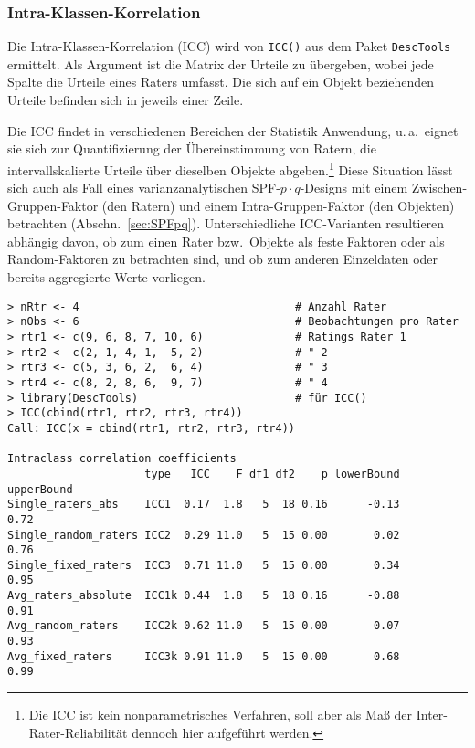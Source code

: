 \subsubsection{Intra-Klassen-Korrelation}

Die Intra-Klassen-Korrelation (ICC) wird von \lstinline!ICC()! aus dem Paket \lstinline!DescTools! ermittelt. Als Argument ist die Matrix der Urteile zu übergeben, wobei jede Spalte die Urteile eines Raters umfasst. Die sich auf ein Objekt beziehenden Urteile befinden sich in jeweils einer Zeile.

Die ICC findet in verschiedenen Bereichen der Statistik Anwendung, u.\,a.\ eignet sie sich zur Quantifizierung der Übereinstimmung von Ratern, die intervallskalierte Urteile über dieselben Objekte abgeben.\footnote{Die ICC ist kein nonparametrisches Verfahren, soll aber als Maß der Inter-Rater-Reliabilität dennoch hier aufgeführt werden.} Diese Situation lässt sich auch als Fall eines varianzanalytischen SPF-$p \cdot q$-Designs mit einem Zwischen-Gruppen-Faktor (den Ratern) und einem Intra-Gruppen-Faktor (den Objekten) betrachten (Abschn.\ \ref{sec:SPFpq}). Unterschiedliche ICC-Varianten resultieren abhängig davon, ob zum einen Rater bzw.\ Objekte als feste Faktoren oder als Random-Faktoren zu betrachten sind, und ob zum anderen Einzeldaten oder bereits aggregierte Werte vorliegen.
\begin{lstlisting}
> nRtr <- 4                                 # Anzahl Rater
> nObs <- 6                                 # Beobachtungen pro Rater
> rtr1 <- c(9, 6, 8, 7, 10, 6)              # Ratings Rater 1
> rtr2 <- c(2, 1, 4, 1,  5, 2)              # " 2
> rtr3 <- c(5, 3, 6, 2,  6, 4)              # " 3
> rtr4 <- c(8, 2, 8, 6,  9, 7)              # " 4
> library(DescTools)                        # für ICC()
> ICC(cbind(rtr1, rtr2, rtr3, rtr4))
Call: ICC(x = cbind(rtr1, rtr2, rtr3, rtr4))

Intraclass correlation coefficients
                     type   ICC    F df1 df2    p lowerBound upperBound
Single_raters_abs    ICC1  0.17  1.8   5  18 0.16      -0.13       0.72
Single_random_raters ICC2  0.29 11.0   5  15 0.00       0.02       0.76
Single_fixed_raters  ICC3  0.71 11.0   5  15 0.00       0.34       0.95
Avg_raters_absolute  ICC1k 0.44  1.8   5  18 0.16      -0.88       0.91
Avg_random_raters    ICC2k 0.62 11.0   5  15 0.00       0.07       0.93
Avg_fixed_raters     ICC3k 0.91 11.0   5  15 0.00       0.68       0.99
\end{lstlisting}

